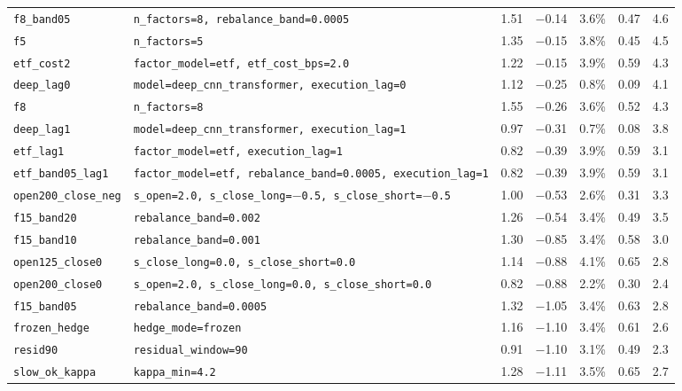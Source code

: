 \begin{longtable}{@{}l>{\raggedright\arraybackslash\footnotesize}p{4.4cm}rrrrr@{}}
\texttt{f8\_band05} & \texttt{n\_factors=8, rebalance\_band=0.0005} & 1.51 & \ensuremath{-}0.14 & 3.6\% & 0.47 & 4.6\\
\texttt{f5} & \texttt{n\_factors=5} & 1.35 & \ensuremath{-}0.15 & 3.8\% & 0.45 & 4.5\\
\texttt{etf\_cost2} & \texttt{factor\_model=etf, etf\_cost\_bps=2.0} & 1.22 & \ensuremath{-}0.15 & 3.9\% & 0.59 & 4.3\\
\texttt{deep\_lag0} & \texttt{model=deep\_cnn\_transformer, execution\_lag=0} & 1.12 & \ensuremath{-}0.25 & 0.8\% & 0.09 & 4.1\\
\texttt{f8} & \texttt{n\_factors=8} & 1.55 & \ensuremath{-}0.26 & 3.6\% & 0.52 & 4.3\\
\texttt{deep\_lag1} & \texttt{model=deep\_cnn\_transformer, execution\_lag=1} & 0.97 & \ensuremath{-}0.31 & 0.7\% & 0.08 & 3.8\\
\texttt{etf\_lag1} & \texttt{factor\_model=etf, execution\_lag=1} & 0.82 & \ensuremath{-}0.39 & 3.9\% & 0.59 & 3.1\\
\texttt{etf\_band05\_lag1} & \texttt{factor\_model=etf, rebalance\_band=0.0005, execution\_lag=1} & 0.82 & \ensuremath{-}0.39 & 3.9\% & 0.59 & 3.1\\
\texttt{open200\_close\_neg} & \texttt{s\_open=2.0, s\_close\_long=\ensuremath{-}0.5, s\_close\_short=\ensuremath{-}0.5} & 1.00 & \ensuremath{-}0.53 & 2.6\% & 0.31 & 3.3\\
\texttt{f15\_band20} & \texttt{rebalance\_band=0.002} & 1.26 & \ensuremath{-}0.54 & 3.4\% & 0.49 & 3.5\\
\texttt{f15\_band10} & \texttt{rebalance\_band=0.001} & 1.30 & \ensuremath{-}0.85 & 3.4\% & 0.58 & 3.0\\
\texttt{open125\_close0} & \texttt{s\_close\_long=0.0, s\_close\_short=0.0} & 1.14 & \ensuremath{-}0.88 & 4.1\% & 0.65 & 2.8\\
\texttt{open200\_close0} & \texttt{s\_open=2.0, s\_close\_long=0.0, s\_close\_short=0.0} & 0.82 & \ensuremath{-}0.88 & 2.2\% & 0.30 & 2.4\\
\texttt{f15\_band05} & \texttt{rebalance\_band=0.0005} & 1.32 & \ensuremath{-}1.05 & 3.4\% & 0.63 & 2.8\\
\texttt{frozen\_hedge} & \texttt{hedge\_mode=frozen} & 1.16 & \ensuremath{-}1.10 & 3.4\% & 0.61 & 2.6\\
\texttt{resid90} & \texttt{residual\_window=90} & 0.91 & \ensuremath{-}1.10 & 3.1\% & 0.49 & 2.3\\
\texttt{slow\_ok\_kappa} & \texttt{kappa\_min=4.2} & 1.28 & \ensuremath{-}1.11 & 3.5\% & 0.65 & 2.7\\

\end{longtable}
